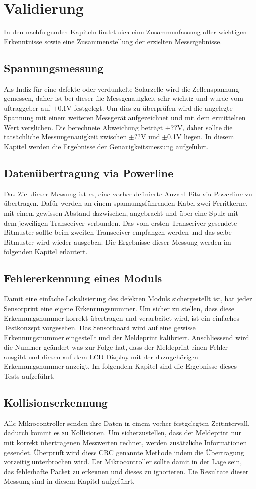 \section{Validierung}
In den nachfolgenden Kapiteln findet sich eine Zusammenfassung aller wichtigen Erkenntnisse sowie eine Zusammenstellung der erzielten Messergebnisse. 
\subsection{Spannungsmessung}
Als Indiz für eine defekte oder verdunkelte Solarzelle wird die Zellenspannung gemessen, daher ist bei dieser die Messgenauigkeit sehr wichtig und wurde vom uftraggeber auf $\pm$0.1V festgelegt. Um dies zu überprüfen wird die angelegte Spannung mit einem weiteren Messgerät aufgezeichnet und mit dem ermittelten Wert verglichen. Die berechnete Abweichung beträgt $\pm$??V, daher sollte die tatsächliche Messungenauigkeit zwischen $\pm$??V und $\pm$0.1V liegen. In diesem Kapitel werden die Ergebnisse der Genauigkeitsmessung aufgeführt.
\subsection{Datenübertragung via Powerline}
Das Ziel dieser Messung ist es, eine vorher definierte Anzahl Bits via Powerline zu übertragen. Dafür werden an einem spannungsführenden Kabel zwei Ferritkerne, mit einem gewissen Abstand dazwischen, angebracht und über eine Spule mit dem jeweiligen Transceiver verbunden. Das vom ersten Transceiver gesendete Bitmuster sollte beim zweiten Transceiver empfangen werden und das selbe Bitmuster wird wieder ausgeben. Die Ergebnisse dieser Messung werden im folgenden Kapitel erläutert.
\subsection{Fehlererkennung eines Moduls}
Damit eine einfache Lokalisierung des defekten Moduls sichergestellt ist, hat jeder Sensorprint eine eigene Erkennungsnummer. Um sicher zu stellen, dass diese Erkennungsnummer korrekt übertragen und verarbeitet wird, ist ein einfaches Testkonzept vorgesehen. Das Sensorboard wird auf eine gewisse Erkennungsnummer eingestellt und der Meldeprint kalibriert. Anschliessend wird die Nummer geändert was zur Folge hat, dass der Meldeprint einen Fehler ausgibt und diesen auf dem LCD-Display mit der dazugehörigen Erkennungsnummer anzeigt. Im folgendem Kapitel sind die Ergebnisse dieses Tests aufgeführt.
\subsection{Kollisionserkennung}
Alle Mikrocontroller senden ihre Daten in einem vorher festgelegten Zeitintervall, dadurch kommt es zu Kollisionen. Um sicherzustellen, dass der Meldeprint nur mit korrekt übertragenen Messwerten rechnet, werden zusätzliche Informationen gesendet. Überprüft wird diese CRC genannte Methode indem die Übertragung vorzeitig unterbrochen wird. Der Mikrocontroller sollte damit in der Lage sein, das fehlerhafte Packet zu erkennen und dieses zu ignorieren. Die Resultate dieser Messung sind in diesem Kapitel aufgeführt.